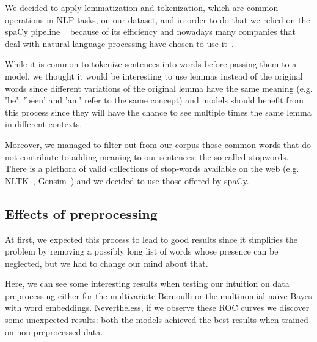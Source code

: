 We decided to apply lemmatization and tokenization, which are common operations in NLP tasks, on our dataset, and in order to do that we relied on the spaCy pipeline ~\cite{startups:spaCy} because of its efficiency and nowadays many companies that deal with natural language processing have chosen to use it~\cite{data:companies_using_spacy}.

While it is common to tokenize sentences into words before passing them to a model, we thought it would be interesting to use lemmas instead of the original words since different variations of the original lemma have the same meaning (e.g. 'be', 'been' and 'am' refer to the same concept) and models should benefit from this process since they will have the chance to see multiple times the same lemma in different contexts.

Moreover, we managed to filter out from our corpus those common words that do not contribute to adding meaning to our sentences: the so called stopwords.
There is a plethora of valid collections of stop-words available on the web (e.g. NLTK~\cite{startups:nltk}, Gensim~\cite{startups:gensim}) and we decided to use those offered by spaCy.


\subsection*{Effects of preprocessing}

At first, we expected this process to lead to good results since it simplifies the problem by removing a possibly long list of words whose presence can be neglected, but we had to change our mind about that.

Here, we can see some interesting results when testing our intuition on data preprocessing either for the multivariate Bernoulli or the multinomial na\"ive Bayes with word embeddings. 
Nevertheless, if we observe these ROC curves we discover some unexpected results: both the models achieved the best results when trained on non-preprocessed data.


